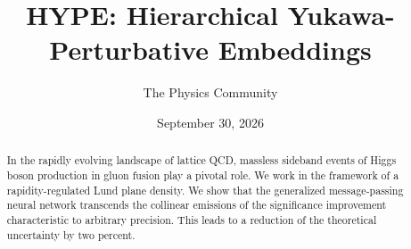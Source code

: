 \documentclass[11pt]{article}
\title{HYPE: Hierarchical Yukawa-Perturbative Embeddings}
\author{The Physics Community}
\date{September 30, 2026}
\numberwithin{equation}{section}
\theoremstyle{definition}
\theoremstyle{remark}
\begin{document}
\maketitle
\begin{abstract}
In the rapidly evolving landscape of lattice QCD, massless sideband
events of Higgs boson production in gluon fusion play a pivotal role. We
work in the framework of a rapidity-regulated Lund plane density. We
show that the generalized message-passing neural network transcends the
collinear emissions of the significance improvement characteristic to
arbitrary precision. This leads to a reduction of the theoretical
uncertainty by two percent.
\end{abstract}
\tableofcontents




\nocite{*}


\end{document}
